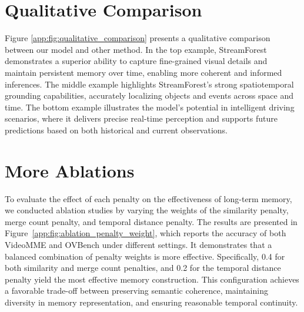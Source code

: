 \section{Qualitative Comparison}
\label{app:sec:Qualitative_Comparison}



Figure \ref{app:fig:qualitative_comparison} presents a qualitative comparison between our model and other method. In the top example, StreamForest demonstrates a superior ability to capture fine-grained visual details and maintain persistent memory over time, enabling more coherent and informed inferences. The middle example highlights StreamForest’s strong spatiotemporal grounding capabilities, accurately localizing objects and events across space and time. The bottom example illustrates the model’s potential in intelligent driving scenarios, where it delivers precise real-time perception and supports future predictions based on both historical and current observations.





\section{More Ablations}
\label{app:sec:More_Ablations}



To evaluate the effect of each penalty on the effectiveness of long-term memory, we conducted ablation studies by varying the weights of the similarity penalty, merge count penalty, and temporal distance penalty. The results are presented in Figure~\ref{app:fig:ablation_penalty_weight}, which reports the accuracy of both VideoMME and OVBench under different settings. It demonstrates that a balanced combination of penalty weights is more effective. Specifically, 0.4 for both similarity and merge count penalties, and 0.2 for the temporal distance penalty yield the most effective memory construction. This configuration achieves a favorable trade-off between preserving semantic coherence, maintaining diversity in memory representation, and ensuring reasonable temporal continuity.








